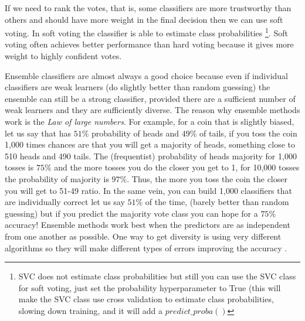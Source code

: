 \documentclass[11pt]{article}
\theoremstyle{definition}
\theoremstyle{remark}
\begin{document}
If we need to rank the votes, that is, some classifiers are more trustworthy than others and should have more weight in the final decision then we can use soft voting. In soft voting the classifier is able to estimate class probabilities \footnote{SVC does not estimate class probabilities but still you can use the SVC class for soft voting, just set the probability hyperparameter to True (this will make the SVC class use cross validation to estimate class probabilities, slowing down training, and it will add a $predict\_proba()$}. Soft voting often achieves better performance than hard voting because it gives more weight to highly confident votes.

Ensemble classifiers are almost always a good choice because even if individual classifiers are weak learners (do slightly better than random guessing) the ensemble can still be a strong classifier, provided there are a sufficient number of weak learners and they are sufficiently diverse. %
The reason why ensemble methods work is the \emph{Law of large numbers}. For example, for a coin that is slightly biased, let us say that has $51\%$ probability of heads and $49\%$ of tails, if you toss the coin 1,000 times chances are that you will get a majority of heads, something close to 510 heads and 490 tails. The (frequentist) probability of heads majority for 1,000 tosses is $75\%$ and the more tosses you do the closer you get to 1, for 10,000 tosses the probability of majority is $97\%$. Thus, the more you toss the coin the closer you will get to 51-49 ratio. In the same vein, you can build 1,000 classifiers that are individually correct let us say $51\%$ of the time, (barely better than random guessing) but if you predict the majority vote class you can hope for a $75\%$ accuracy! Ensemble methods work best when the predictors are as independent from one another as possible. One way to get diversity is using very different algorithms so they will make different types of errors improving the accuracy \cite{geron2017hands}. 
\end{document}
